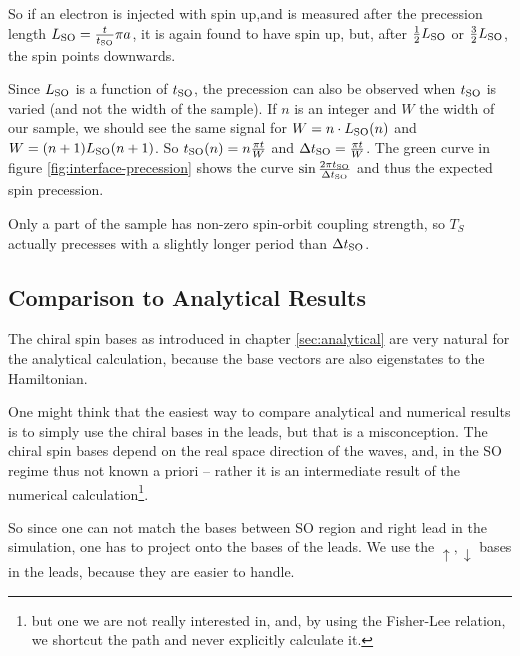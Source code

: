 So if an electron is injected with spin up,and is measured after the
precession length $L_{\textnormal{SO}} = \frac{t}{t_{\textnormal{SO}}}\pi a$, it is again found to have
spin up, but, after $\frac12 L_{\textnormal{SO}}$ or $\frac32 L_{\textnormal{SO}}$, the spin points
downwards. 

Since  $L_{\textnormal{SO}}$ is a function of $t_{\textnormal{SO}}$, the precession can also be
observed when $t_{\textnormal{SO}}$ is varied (and not the width of the sample).
If $n$ is an integer and $W$ the width of our sample, we should see the
same signal for $W = n \cdot L_{\textnormal{SO}}(n)$ and $W = (n+1) L_{\textnormal{SO}}(n+1)$. So
$t_{\textnormal{SO}}(n) = n\frac{\pi t}{W}$ and $\Delta t_{\textnormal{SO}} = \frac{\pi t}{W}$.  The green
curve in figure \ref{fig:interface-precession} shows the curve
$\sin{\frac{2 \pi \ensuremath{t_{\textnormal{SO}}}}{\Delta \ensuremath{t_{\textnormal{SO}}}}}$ and thus the expected spin precession.

Only a part of the sample has non-zero spin-orbit coupling strength, so $T_S$
actually precesses with a slightly longer period than $\Delta t_{\textnormal{SO}}$.

\subsection{Comparison to Analytical Results}

The chiral spin bases as introduced in chapter \ref{sec:analytical} are very
natural for the analytical calculation, because the
base vectors are also eigenstates to the Hamiltonian.

One might think that the easiest way to compare analytical and numerical
results is to simply use the chiral bases in the leads, but that is a
misconception. The chiral spin bases depend on the real space direction
of the waves, and, in the SO regime thus not known a priori --
rather it is an intermediate
result of the numerical calculation\footnote{but one we are not really
interested in, and, by using the Fisher-Lee relation, we shortcut the path and
never explicitly calculate it.}.

So since one can not match the bases between SO region and right lead in the
simulation, one has
to project onto the bases of the leads. We use the $\uparrow,\downarrow$ bases
in the leads, because they are easier to handle.

